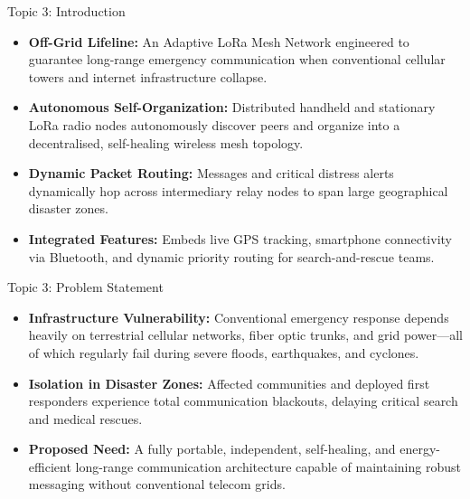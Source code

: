 \documentclass{beamer}
\begin{document}
\begin{frame}{Topic 3: Introduction}
\begin{itemize}
  \item \textbf{Off-Grid Lifeline:} An Adaptive LoRa Mesh Network engineered to guarantee long-range emergency communication when conventional cellular towers and internet infrastructure collapse.
  \vspace{0.25cm}
  \item \textbf{Autonomous Self-Organization:} Distributed handheld and stationary LoRa radio nodes autonomously discover peers and organize into a decentralised, self-healing wireless mesh topology.
  \vspace{0.25cm}
  \item \textbf{Dynamic Packet Routing:} Messages and critical distress alerts dynamically hop across intermediary relay nodes to span large geographical disaster zones.
  \vspace{0.25cm}
  \item \textbf{Integrated Features:} Embeds live GPS tracking, smartphone connectivity via Bluetooth, and dynamic priority routing for search-and-rescue teams.
\end{itemize}
\end{frame}

\begin{frame}{Topic 3: Problem Statement}
\begin{itemize}
  \item \textbf{Infrastructure Vulnerability:} Conventional emergency response depends heavily on terrestrial cellular networks, fiber optic trunks, and grid power—all of which regularly fail during severe floods, earthquakes, and cyclones.
  \vspace{0.35cm}
  \item \textbf{Isolation in Disaster Zones:} Affected communities and deployed first responders experience total communication blackouts, delaying critical search and medical rescues.
  \vspace{0.35cm}
  \item \textbf{Proposed Need:} A fully portable, independent, self-healing, and energy-efficient long-range communication architecture capable of maintaining robust messaging without conventional telecom grids.
\end{itemize}
\end{frame}
\end{document}
